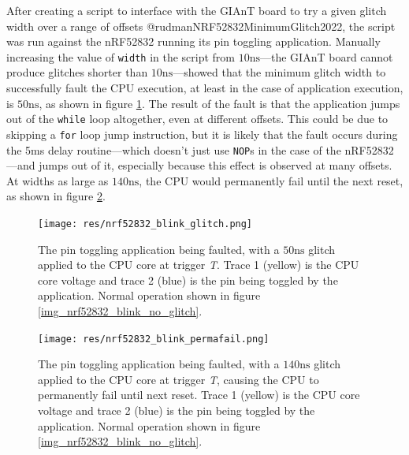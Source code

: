 After creating a script to interface with the GIAnT board to try a given
glitch width over a range of offsets @rudmanNRF52832MinimumGlitch2022,
the script was run against the nRF52832 running its pin toggling
application. Manually increasing the value of \texttt{width} in the
script from \(10\si{\nano\second}\)---the GIAnT board cannot produce
glitches shorter than \(10\si{\nano\second}\)---showed that the minimum
glitch width to successfully fault the CPU execution, at least in the
case of application execution, is \(50\si{\nano\second}\), as shown in
figure \ref{img_nrf52832_blink_glitch}. The result of the fault is that
the application jumps out of the \texttt{while} loop altogether, even at
different offsets. This could be due to skipping a \texttt{for} loop
jump instruction, but it is likely that the fault occurs during the 5ms
delay routine---which doesn't just use \texttt{NOP}s in the case of the
nRF52832---and jumps out of it, especially because this effect is
observed at many offsets. At widths as large as
\(140\si{\nano\second}\), the CPU would permanently fail until the next
reset, as shown in figure \ref{img_nrf52832_blink_permafail}.

\begin{figure}
\centering
\texttt{[image: res/nrf52832\_blink\_glitch.png]}
\caption{The pin toggling application being faulted, with a
\(50\si{\nano\second}\) glitch applied to the CPU core at trigger
\emph{T}. Trace 1 (yellow) is the CPU core voltage and trace 2 (blue) is
the pin being toggled by the application. Normal operation shown in
figure
\ref{img_nrf52832_blink_no_glitch}.\label{img_nrf52832_blink_glitch}}
\end{figure}

\begin{figure}
\centering
\texttt{[image: res/nrf52832\_blink\_permafail.png]}
\caption{The pin toggling application being faulted, with a
\(140\si{\nano\second}\) glitch applied to the CPU core at trigger
\emph{T}, causing the CPU to permanently fail until next reset. Trace 1
(yellow) is the CPU core voltage and trace 2 (blue) is the pin being
toggled by the application. Normal operation shown in figure
\ref{img_nrf52832_blink_no_glitch}.\label{img_nrf52832_blink_permafail}}
\end{figure}

